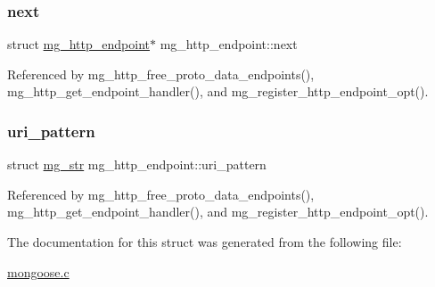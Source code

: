 \subsubsection{\texorpdfstring{next}{next}}
{\footnotesize\ttfamily struct \hyperlink{structmg__http__endpoint}{mg\+\_\+http\+\_\+endpoint}$\ast$ mg\+\_\+http\+\_\+endpoint\+::next}



Referenced by mg\+\_\+http\+\_\+free\+\_\+proto\+\_\+data\+\_\+endpoints(), mg\+\_\+http\+\_\+get\+\_\+endpoint\+\_\+handler(), and mg\+\_\+register\+\_\+http\+\_\+endpoint\+\_\+opt().

\mbox{\label{structmg__http__endpoint_a72024abf72236a0bd7a529182ce78d36_a72024abf72236a0bd7a529182ce78d36}} 
\subsubsection{\texorpdfstring{uri\+\_\+pattern}{uri\_pattern}}
{\footnotesize\ttfamily struct \hyperlink{structmg__str}{mg\+\_\+str} mg\+\_\+http\+\_\+endpoint\+::uri\+\_\+pattern}



Referenced by mg\+\_\+http\+\_\+free\+\_\+proto\+\_\+data\+\_\+endpoints(), mg\+\_\+http\+\_\+get\+\_\+endpoint\+\_\+handler(), and mg\+\_\+register\+\_\+http\+\_\+endpoint\+\_\+opt().



The documentation for this struct was generated from the following file\+:\begin{DoxyCompactItemize}
\item 
\hyperlink{mongoose_8c}{mongoose.\+c}\end{DoxyCompactItemize}
